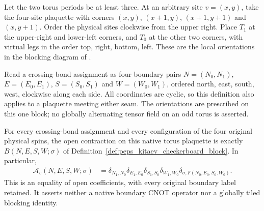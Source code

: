 \begin{definition}%
    \label{def:peps_kitaev_native_checkerboard_block}
    \leanok
    Let the two torus periods be at least three. At an arbitrary site
    $v=(x,y)$, take the four-site plaquette with corners
    $(x,y)$, $(x+1,y)$, $(x+1,y+1)$ and $(x,y+1)$.
    Order the physical sites clockwise from the upper right.
    Place $T_1$ at the upper-right and lower-left corners, and $T_0$
    at the other two corners, with virtual legs in the order top, right,
    bottom, left. These are the local orientations in the blocking diagram
    of \cite[Section~7, ``Kitaev's code state'']{Schuch2010PEPS}.

    Read a crossing-bond assignment as four boundary pairs
    $N=(N_0,N_1)$, $E=(E_0,E_1)$, $S=(S_0,S_1)$ and $W=(W_0,W_1)$,
    ordered north, east, south, west, clockwise along each side.
    All coordinates are cyclic, so this definition also applies to a
    plaquette meeting either seam. The orientations are prescribed on this
    one block; no globally alternating tensor field on an odd torus is
    asserted.
\end{definition}

\begin{lemma}%
    \label{thm:peps_kitaev_native_checkerboard_identification}
    \leanok
    For every crossing-bond assignment and every configuration of the
    four original physical spins, the open contraction on this native
    torus plaquette is exactly $B(N,E,S,W;\sigma)$ of
    Definition~\ref{def:peps_kitaev_checkerboard_block}. In particular,
    \begin{align}
        \mathcal A_v(N,E,S,W;\sigma)
         & =\delta_{N_1,N_0}\delta_{E_1,E_0}
        \delta_{S_1,S_0}\delta_{W_1,W_0}
        \delta_{\sigma,F(N_0,E_0,S_0,W_0)}.
    \end{align}
    This is an equality of open coefficients, with every original
    boundary label retained. It asserts neither a native boundary CNOT
    operator nor a globally tiled blocking identity.
\end{lemma}

